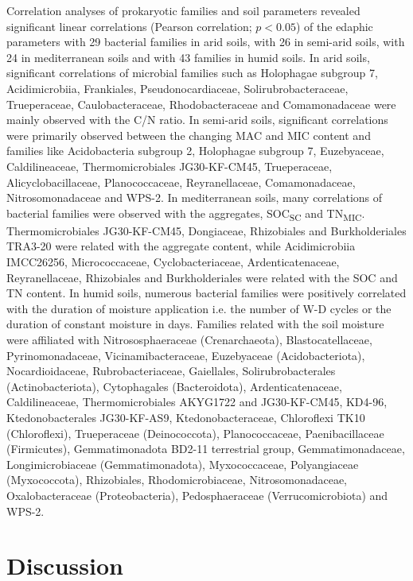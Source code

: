 Correlation analyses of prokaryotic families and soil parameters revealed significant linear correlations (Pearson correlation; \(p < 0.05\)) of the edaphic parameters with 29 bacterial families in arid soils, with 26 in semi-arid soils, with 24 in mediterranean soils and with 43 families in humid soils. In arid soils, significant correlations of microbial families such as Holophagae subgroup 7, Acidimicrobiia, Frankiales, Pseudonocardiaceae, Solirubrobacteraceae, Trueperaceae, Caulobacteraceae, Rhodobacteraceae and Comamonadaceae were mainly observed with the C/N ratio. In semi-arid soils, significant correlations were primarily observed between the changing MAC and MIC content and families like Acidobacteria subgroup 2, Holophagae subgroup 7, Euzebyaceae, Caldilineaceae, Thermomicrobiales JG30-KF-CM45, Trueperaceae, Alicyclobacillaceae, Planococcaceae, Reyranellaceae, Comamonadaceae, Nitrosomonadaceae and WPS-2. In mediterranean soils, many correlations of bacterial families were observed with the aggregates, SOC\textsubscript{SC} and TN\textsubscript{MIC}. Thermomicrobiales JG30-KF-CM45, Dongiaceae, Rhizobiales and Burkholderiales TRA3-20 were related with the aggregate content, while Acidimicrobiia IMCC26256, Micrococcaceae, Cyclobacteriaceae, Ardenticatenaceae, Reyranellaceae, Rhizobiales and Burkholderiales were related with the SOC and TN content. In humid soils, numerous bacterial families were positively correlated with the duration of moisture application i.e. the number of W-D cycles or the duration of constant moisture in days. Families related with the soil moisture were affiliated with Nitrososphaeraceae (Crenarchaeota), Blastocatellaceae, Pyrinomonadaceae, Vicinamibacteraceae, Euzebyaceae (Acidobacteriota), Nocardioidaceae, Rubrobacteriaceae, Gaiellales, Solirubrobacterales (Actinobacteriota), Cytophagales (Bacteroidota), Ardenticatenaceae, Caldilineaceae, Thermomicrobiales AKYG1722 and JG30-KF-CM45, KD4-96, Ktedonobacterales JG30-KF-AS9, Ktedonobacteraceae, Chloroflexi TK10 (Chloroflexi), Trueperaceae (Deinococcota), Planococcaceae, Paenibacillaceae (Firmicutes), Gemmatimonadota BD2-11 terrestrial group, Gemmatimonadaceae, Longimicrobiaceae (Gemmatimonadota), Myxococcaceae, Polyangiaceae (Myxococcota), Rhizobiales, Rhodomicrobiaceae, Nitrosomonadaceae, Oxalobacteraceae (Proteobacteria), Pedosphaeraceae (Verrucomicrobiota) and WPS-2.

\section{Discussion}

